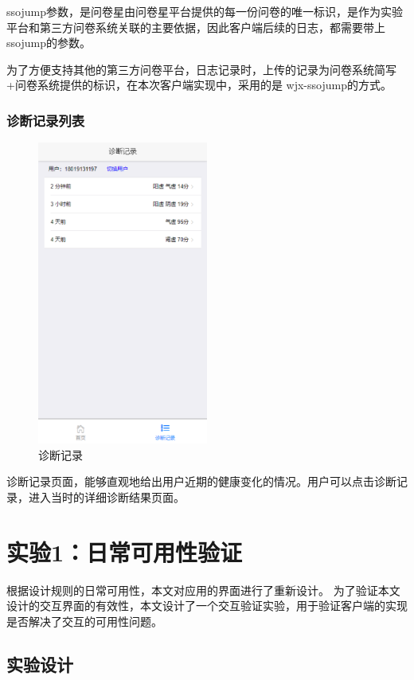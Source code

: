 ssojump参数，是问卷星由问卷星平台提供的每一份问卷的唯一标识，是作为实验平台和第三方问卷系统关联的主要依据，因此客户端后续的日志，都需要带上ssojump的参数。

为了方便支持其他的第三方问卷平台，日志记录时，上传的记录为问卷系统简写+问卷系统提供的标识，在本次客户端实现中，采用的是 wjx-ssojump的方式。

\subsubsection{诊断记录列表}
\begin{figure}[ht]
    \centering
    \includegraphics[height=10cm]{images/history.png}
    \caption{诊断记录}
    \label{fig:history}
\end{figure}
诊断记录页面，能够直观地给出用户近期的健康变化的情况。用户可以点击诊断记录，进入当时的详细诊断结果页面。

\section{实验1：日常可用性验证}

根据设计规则的日常可用性，本文对应用的界面进行了重新设计。
为了验证本文设计的交互界面的有效性，本文设计了一个交互验证实验，用于验证客户端的实现是否解决了交互的可用性问题。

\subsection{实验设计}

